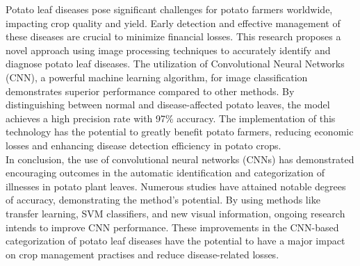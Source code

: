 \documentclass[conference]{IEEEtran}
\begin{document}
Potato leaf diseases pose significant challenges for potato farmers worldwide, impacting crop quality and yield. Early detection and effective management of these diseases are crucial to minimize financial losses.\cite{10112080} This research proposes a novel approach using image processing techniques to accurately identify and diagnose potato leaf diseases. The utilization of Convolutional Neural Networks (CNN), a powerful machine learning algorithm, for image classification demonstrates superior performance compared to other methods. By distinguishing between normal and disease-affected potato leaves, the model achieves a high precision rate with 97\% accuracy. The implementation of this technology has the potential to greatly benefit potato farmers, reducing economic losses and enhancing disease detection efficiency in potato crops. \\


In conclusion, the use of convolutional neural networks (CNNs) has demonstrated encouraging outcomes in the automatic identification and categorization of illnesses in potato plant leaves. Numerous studies have attained notable degrees of accuracy, demonstrating the method's potential. By using methods like transfer learning, SVM classifiers, and new visual information, ongoing research intends to improve CNN performance. These improvements in the CNN-based categorization of potato leaf diseases have the potential to have a major impact on crop management practises and reduce disease-related losses.




\end{document}
